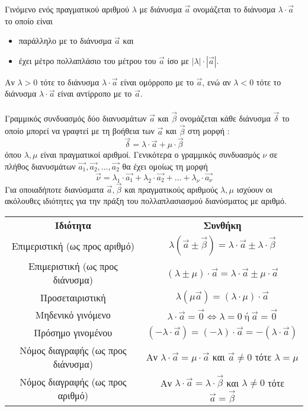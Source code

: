 \documentclass[twoside,nofonts,internet,shmeiwseis]{thewria}
\begin{document}
\orismoi
{}
Γινόμενο ενός πραγματικού αριθμού $ \lambda $ με διάνυσμα $ \vec{a} $ ονομάζεται το διάνυσμα $ \lambda\cdot\vec{a} $ το οποίο είναι 
\begin{itemize}[itemsep=0mm]
\item παράλληλο με το διάνυσμα $ \vec{a} $ και
\item έχει μέτρο πολλαπλάσιο του μέτρου του $ \vec{a} $ ίσο με $ |\lambda|\cdot|\vec{a}| $.
\end{itemize}
Αν $ \lambda>0 $ τότε το διάνυσμα $ \lambda\cdot\vec{a} $ είναι ομόρροπο με το $ \vec{a} $, ενώ αν $ \lambda<0 $ τότε το διάνυσμα $ \lambda\cdot\vec{a} $ είναι αντίρροπο με το $ \vec{a} $.\\\\
Γραμμικός συνδυασμός δύο διανυσμάτων $ \vec{a} $ και $ \vec{\beta} $ ονομάζεται κάθε διάνυσμα $ \vec{\delta} $ το οποίο μπορεί να γραφτεί με τη βοήθεια των $ \vec{a} $ και $ \vec{\beta} $ στη μορφή :
\[ \vec{\delta}=\lambda\cdot\vec{a}+\mu\cdot\vec{\beta} \] όπου $ \lambda,\mu $ είναι πραγματικοί αριθμοί. Γενικότερα ο γραμμικός συνδυασμός $ \nu $ σε πλήθος διανυσμάτων $ \vec{a_1},\vec{a_2},\ldots,\vec{a_2} $ θα έχει ομοίως τη μορφή
\[ \vec{\nu}=\lambda_1\cdot\vec{a_1}+\lambda_2\cdot\vec{a_2}+\ldots+\lambda_\nu\cdot\vec{a_\nu} \]
\thewrhmata
{}
Για οποιαδήποτε διανύσματα $ \vec{a},\vec{\beta} $ και πραγματικούς αριθμούς $ \lambda,\mu $ ισχύουν οι ακόλουθες ιδιότητες για την πράξη του πολλαπλασιασμού διανύσματος με αριθμό.
\begin{center}
\begin{longtable}{cc}
\hline \rule[-2ex]{0pt}{5.5ex} \textbf{Ιδιότητα} & \textbf{Συνθήκη} \\ 
\hhline{==} \rule[-2ex]{0pt}{5.5ex} Επιμεριστική (ως προς αριθμό) & $ \lambda\left( \vec{a}\pm\vec{\beta}\right)=\lambda\cdot\vec{a}\pm\lambda\cdot\vec{\beta} $ \\ 
\rule[-2ex]{0pt}{5.5ex} Επιμεριστική (ως προς διάνυσμα) & $ \left( \lambda\pm\mu\right)\cdot\vec{a}=\lambda\cdot\vec{a}\pm\mu\cdot\vec{a} $ \\
\rule[-2ex]{0pt}{5.5ex} Προσεταιριστική & $ \lambda\left( \mu\vec{a}\right)=\left( \lambda\cdot\mu\right)\cdot\vec{a} $ \\ 
\rule[-2ex]{0pt}{5.5ex} Μηδενικό γινόμενο & $ \lambda\cdot\vec{a}=\vec{0}\Leftrightarrow \lambda=0 \ \textrm{ή}\ \vec{a}=\vec{0} $ \\ 
\rule[-2ex]{0pt}{5.5ex} Πρόσημο γινομένου & $ \left( -\lambda\cdot\vec{a}\right)=(-\lambda)\cdot\vec{a}=-\left( \lambda\cdot\vec{a}\right)  $ \\ 
\rule[-2ex]{0pt}{5.5ex} Νόμος διαγραφής (ως προς διάνυσμα) & Αν $ \lambda\cdot\vec{a}=\mu\cdot\vec{a} $ και $ \vec{a}\neq0 $ τότε $ \lambda=\mu $ \\ 
\rule[-2ex]{0pt}{5.5ex} Νόμος διαγραφής (ως προς αριθμό) & Αν $ \lambda\cdot\vec{a}=\lambda\cdot\vec{\beta} $ και $ \lambda\neq0 $ τότε $ \vec{a}=\vec{\beta} $\\ 
\hline 
\end{longtable}
\end{center} 
\end{document}
